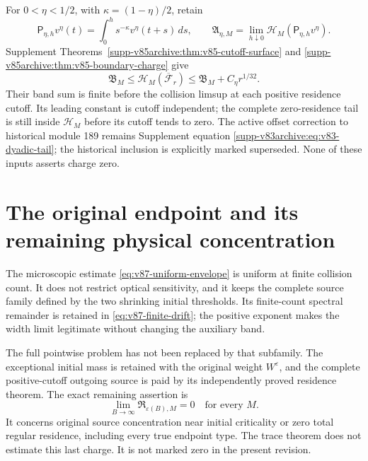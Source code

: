 \documentclass[11pt,reqno]{amsart}
\numberwithin{equation}{section}
\theoremstyle{definition}\newtheorem{definition}[theorem]{Definition}
\theoremstyle{remark}\newtheorem{remark}[theorem]{Remark}
\theoremstyle{definition}\newtheorem{inputstatement}[theorem]{Input statement}
\begin{document}
For $0<\eta<1/2$, with $\kappa=(1-\eta)/2$, retain
\[
 \mathsf P_{\eta,h}v^\eta(t)=\int_0^h s^{-\kappa}v^\eta(t+s)\,ds,
 \qquad\mathfrak A_{\eta,M}
       =\lim_{h\downarrow0}\mathcal H_M(\mathsf P_{\eta,h}v^\eta).
\]
Supplement Theorems~\ref{supp-v85archive:thm:v85-cutoff-surface}
and \ref{supp-v85archive:thm:v85-boundary-charge} give
\begin{equation}\label{eq:v86-surface-input}
 \mathfrak B_M\le\mathcal H_M(\overline{\mathcal F}_r)
                         \le\mathfrak B_M+C_\eta r^{1/32}.
\end{equation}
Their band sum is finite before the collision limsup at each positive
residence cutoff. Its leading constant is cutoff independent; the
complete zero-residence tail is still inside $\mathcal H_M$ before
its cutoff tends to zero. The active offset correction to historical
module 189 remains Supplement equation
\eqref{supp-v83archive:eq:v83-dyadic-tail}; the historical inclusion is
explicitly marked superseded. None of these inputs asserts charge zero.






\section{The original endpoint and its remaining physical concentration}
The microscopic estimate \eqref{eq:v87-uniform-envelope} is uniform
at finite collision count. It does not restrict optical sensitivity,
and it keeps the complete source family defined by the two shrinking
initial thresholds. Its finite-count spectral remainder is retained
in \eqref{eq:v87-finite-drift}; the positive exponent makes the width
limit legitimate without changing the auxiliary band.

The full pointwise problem has not been replaced by that subfamily.
The exceptional initial mass is retained with the original weight
$W^\varepsilon$, and the complete positive-cutoff outgoing source
is paid by its independently proved residence theorem. The exact
remaining assertion is
\[
 \lim_{B\to\infty}\mathfrak R_{\varepsilon(B),M}=0
 \quad\text{for every }M.
\]
It concerns original source concentration near initial criticality or
zero total regular residence, including every true endpoint type.
The trace theorem does not estimate this last charge. It is not marked
zero in the present revision.
\end{document}
